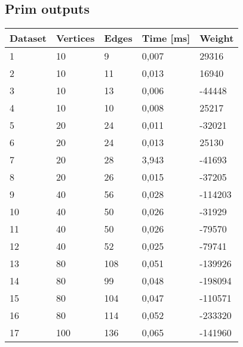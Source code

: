 \subsection{Prim outputs}
\begin{longtable}{lllll}
    \textbf{Dataset} & \textbf{Vertices} & \textbf{Edges} & \textbf{Time [ms]} & \textbf{Weight} \\
    \endhead
    1                & 10             & 9              & 0,007       & 29316           \\
    2                & 10             & 11             & 0,013       & 16940           \\
    3                & 10             & 13             & 0,006       & -44448          \\
    4                & 10             & 10             & 0,008       & 25217           \\
    5                & 20             & 24             & 0,011       & -32021          \\
    6                & 20             & 24             & 0,013       & 25130           \\
    7                & 20             & 28             & 3,943       & -41693          \\
    8                & 20             & 26             & 0,015       & -37205          \\
    9                & 40             & 56             & 0,028       & -114203         \\
    10               & 40             & 50             & 0,026       & -31929          \\
    11               & 40             & 50             & 0,026       & -79570          \\
    12               & 40             & 52             & 0,025       & -79741          \\
    13               & 80             & 108            & 0,051       & -139926         \\
    14               & 80             & 99             & 0,048       & -198094         \\
    15               & 80             & 104            & 0,047       & -110571         \\
    16               & 80             & 114            & 0,052       & -233320         \\
    17               & 100            & 136            & 0,065       & -141960         \\

\end{longtable}
